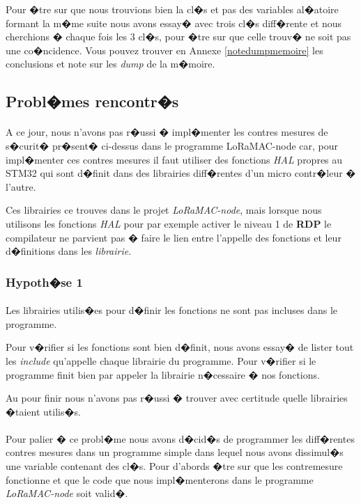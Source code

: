 \documentclass[a4paper, titlepage,12pt]{report}
\begin{document}
Pour �tre sur que nous trouvions bien la cl�s et pas des variables al�atoire formant la m�me suite nous avons essay� avec trois cl�s diff�rente et nous cherchions � chaque fois les 3 cl�s, pour �tre sur que celle trouv� ne soit pas une co�ncidence. Vous pouvez trouver en Annexe \ref{notedumpmemoire} les conclusions et note sur les \textit{dump} de la m�moire.
\pagebreak

\subsection{Probl�mes rencontr�s}
\paragraph{}
A ce jour, nous n'avons pas r�ussi � impl�menter les contres mesures de s�curit� pr�sent� ci-dessus dans le programme LoRaMAC-node car, pour impl�menter ces contres mesures il faut utiliser des fonctions \textit{HAL} propres au STM32 qui sont d�finit dans des librairies diff�rentes d'un micro contr�leur � l'autre.

Ces librairies ce trouves dans le projet \textit{LoRaMAC-node}, mais lorsque nous utilisons les fonctions \textit{HAL} pour par exemple activer le niveau 1 de \textbf{RDP} le compilateur ne parvient pas � faire le lien entre l'appelle des fonctions et leur d�finitions dans les \textit{librairie}.

\subsubsection{Hypoth�se 1}
\paragraph{}
Les librairies utilis�es pour d�finir les fonctions ne sont pas incluses dans le programme. 

Pour v�rifier si les fonctions sont bien d�finit, nous avons essay� de lister tout les \textit{include} qu'appelle chaque librairie du programme. Pour v�rifier si le programme finit bien par appeler la librairie n�cessaire � nos fonctions.

Au pour finir nous n'avons pas r�ussi � trouver avec certitude quelle librairies �taient utilis�s.

\paragraph{}
Pour palier � ce probl�me nous avons d�cid�s de programmer les diff�rentes contres mesures dans un programme simple dans lequel nous avons dissimul�s une variable contenant des cl�s. Pour d'abords �tre sur que les contremesure fonctionne et que le code que nous impl�menterons dans le programme \textit{LoRaMAC-node} soit valid�.
\end{document}
